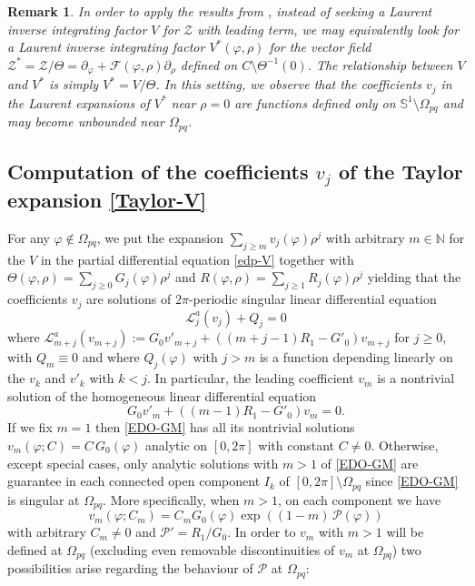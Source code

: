 \documentclass[12pt]{amsart}
\newtheorem {remark} [theorem]{\sc Remark}
\begin{document}
\begin{remark}\label{remark-cilindro}
{\rm In order to apply the results from \cite{GGR}, instead of seeking a Laurent inverse integrating factor $V$ for $\mathcal{Z}$ with leading term, we may equivalently look for a Laurent inverse integrating factor $V^*(\varphi, \rho)$ for the vector field $\mathcal{Z}^* = \mathcal{Z}/\Theta = \partial_\varphi + \mathcal{F}(\varphi, \rho) \partial_\rho$ defined on $C \setminus \Theta^{-1}(0)$. The relationship between $V$ and $V^*$ is simply $V^* = V / \Theta$. In this setting, we observe that the coefficients $v_j$ in the Laurent expansions of $V^*$ near $\rho = 0$ are functions defined only on $\mathbb{S}^1 \setminus \Omega_{pq}$ and may become unbounded near $\Omega_{pq}$. }
\end{remark}

\subsection{Computation of the coefficients $v_j$ of the Taylor expansion \eqref{Taylor-V}} \label{SS-ascending}

For any $\varphi \not\in \Omega_{pq}$, we put the expansion $\sum_{j \geq m} v_j(\varphi) \rho^{j}$ with arbitrary $m \in \mathbb{N}$ for the $V$ in the partial differential equation \eqref{edp-V} together with $\Theta(\varphi, \rho) = \sum_{j \geq 0} G_j(\varphi) \rho^{j}$ and $R(\varphi, \rho) = \sum_{j \geq 1} R_j(\varphi) \rho^{j}$ yielding that the coefficients $v_j$ are solutions of $2 \pi$-periodic singular linear differential equation
\begin{equation}\label{edo-para-vj}
\mathcal{L}^{a}_j(v_j) + Q_j = 0
\end{equation}
where $\mathcal{L}^{a}_{m+j}(v_{m+j}) := G_0 v'_{m+j} + ((m+j-1) R_1 - G'_0) v_{m+j}$ for $j \geq 0$, with $Q_m \equiv 0$ and where $Q_j(\varphi)$ with $j > m$ is a function depending linearly on the $v_k$ and $v'_k$ with $k < j$. In particular, the leading coefficient $v_m$ is a nontrivial solution of the homogeneous linear differential equation
\begin{equation}\label{EDO-GM}
G_0 v'_m + ((m-1) R_1 - G'_0) v_m = 0.
\end{equation}
If we fix $m=1$ then \eqref{EDO-GM} has all its nontrivial solutions $v_m(\varphi; C) = C \, G_0(\varphi)$ analytic on $[0, 2\pi]$ with constant $C \neq 0$. Otherwise, except special cases, only analytic solutions with $m > 1$ of \eqref{EDO-GM} are guarantee in each connected open component $I_k$ of $[0, 2\pi] \setminus \Omega_{pq}$ since \eqref{EDO-GM} is singular at $\Omega_{pq}$. More specifically, when $m > 1$, on each component we have
\begin{equation}\label{vm-explicit}
v_m(\varphi; C_m) = C_m G_0(\varphi) \exp\left( (1-m) \, \mathcal{P}(\varphi) \right)
\end{equation}
with arbitrary $C_m \neq 0$ and $\mathcal{P}' = R_1/G_0$. In order to $v_m$ with $m >1$ will be defined at $\Omega_{pq}$ (excluding even removable discontinuities of $v_m$ at $\Omega_{pq}$) two possibilities arise regarding the behaviour of $\mathcal{P}$ at $\Omega_{pq}$:
\end{document}
